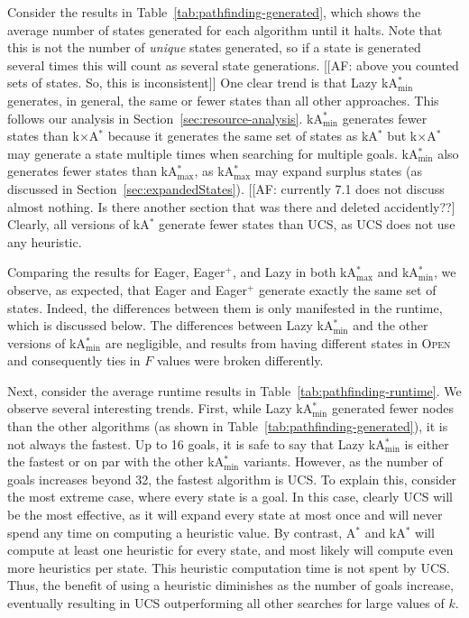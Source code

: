 \documentclass[twoside,11pt]{article}
\newcommand{\astar}{A$^*$\xspace}
\newcommand{\kastar}{kA$^*$\xspace}
\newcommand{\kastarvar}[1]{\textup{kA}$^*_{#1}$\xspace}
\newcommand{\kastarmin}{\kastarvar{\min}}
\newcommand{\kastarmax}{\kastarvar{\max}}
\newcommand{\kxastar}{k$\times$A$^*$\xspace}
\newcommand{\open}{\textsc{Open}\xspace}
\begin{document}
Consider the results in Table~\ref{tab:pathfinding-generated}, which shows the average number of states generated for each algorithm until it halts.
Note that this is not the number of \emph{unique} states generated, so if a state is generated several times this will count as several state generations. [[AF: above you counted sets of states. So, this is inconsistent]]
One clear trend is that Lazy \kastarmin generates, in general, the same or fewer states than all other approaches.
This follows our analysis in Section~\ref{sec:resource-analysis}.
\kastarmin generates fewer states than \kxastar because it generates the same set of states as \kastar but \kxastar may generate a state multiple times when searching for multiple goals.
\kastarmin also generates fewer states than \kastarmax, as \kastarmax may expand surplus states (as discussed in Section~\ref{sec:expandedStates}). [[AF: currently 7.1 does not discuss almost nothing. Is there another section that was there and deleted accidently??]
Clearly, all versions of \kastar generate fewer states than UCS, as UCS does not use any heuristic.

Comparing the results for Eager, Eager$^+$, and Lazy in both \kastarmax and \kastarmin, we observe, as expected, that Eager and Eager$^+$ generate exactly the same set of states.
Indeed, the differences between them is only manifested in the runtime, which is discussed below. The differences between Lazy \kastarmin and the other versions of \kastarmin are negligible, and results from having different states in \open and consequently ties in $F$ values were broken differently.

Next, consider the average runtime results in Table~\ref{tab:pathfinding-runtime}.
We observe several interesting trends.
First, while Lazy \kastarmin generated fewer nodes than the other algorithms (as shown in Table~\ref{tab:pathfinding-generated}), it is not always the fastest.
Up to 16 goals, it is safe to say that Lazy \kastarmin is either the fastest or on par with the other \kastarmin variants.
However, as the number of goals increases beyond 32, the fastest algorithm is UCS.
To explain this, consider the most extreme case, where every state is a goal.
In this case, clearly UCS will be the most effective, as it will expand every state at most once and will never spend any time on computing a heuristic value.
By contrast, \astar and \kastar will compute at least one heuristic for every state, and most likely will compute even more heuristics per state.
This heuristic computation time is not spent by UCS.
Thus, the benefit of using a heuristic diminishes as the number of goals increase, eventually resulting in UCS outperforming all other searches for large values of $k$.
\end{document}
